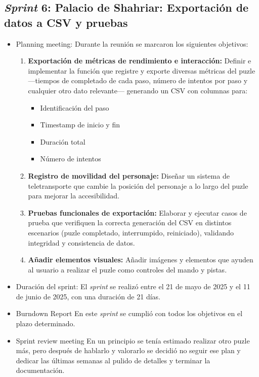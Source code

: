 \subsection{\textbf{\textit{Sprint} 6: Palacio de Shahriar: Exportación de datos a CSV y pruebas }}
\begin{itemize}
\item {Planning meeting}:
Durante la reunión se marcaron los siguientes objetivos:

\begin{enumerate}
  \item \textbf{Exportación de métricas de rendimiento e interacción:}  
    Definir e implementar la función que registre y exporte diversas métricas del puzle —tiempos de completado de cada paso, número de intentos por paso y cualquier otro dato relevante— generando un CSV con columnas para:
    \begin{itemize}
      \item Identificación del paso
      \item Timestamp de inicio y fin
      \item Duración total
      \item Número de intentos
    \end{itemize}

  \item \textbf{Registro de movilidad del personaje:}  
    Diseñar un sistema de teletransporte que cambie la posición del personaje a lo largo del puzle para mejorar la accesibilidad.

  \item \textbf{Pruebas funcionales de exportación:}  
    Elaborar y ejecutar casos de prueba que verifiquen la correcta generación del CSV en distintos escenarios (puzle completado, interrumpido, reiniciado), validando integridad y consistencia de datos.
    
   \item \textbf{Añadir elementos visuales:}
   Añadir imágenes y elementos que ayuden al usuario a realizar el puzle como controles del mando y pistas.
   
\end{enumerate}

    \item {Duración del sprint:}
El \textit{sprint } se realizó entre el 21 de mayo de 2025 y el 11 de junio de 2025, con una duración de 21 días.

    \item {Burndown Report}
En este \textit{sprint} se cumplió con todos los objetivos en el plazo determinado.

    \item {Sprint review meeting}
En un principio se tenía estimado realizar otro puzle más, pero después de hablarlo y valorarlo se decidió no seguir ese plan y dedicar las últimas semanas al pulido de detalles y terminar la documentación.


\end{itemize}

